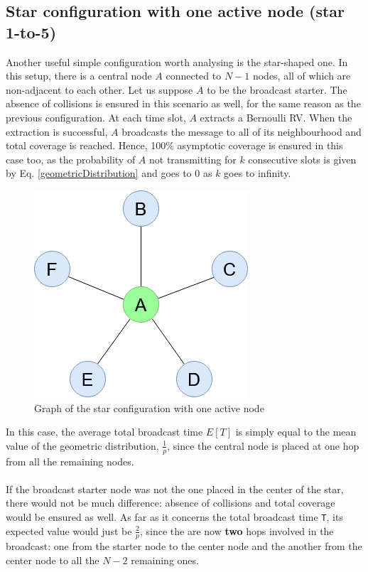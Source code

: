 \subsection{Star configuration with one active node (star 1-to-5)}
\label{ssec:star1}
Another useful simple configuration worth analysing is the star-shaped one. In
this setup, there is a central node $A$ connected to $N - 1$ nodes, all of which
are non-adjacent to each other. Let us suppose $A$ to be the broadcast starter.
The absence of collisions is ensured in this scenario as well, for the
same reason as the previous configuration.
At each time slot, $A$ extracts a Bernoulli RV. When the extraction is
successful, $A$ broadcasts the message to all of its neighbourhood and total
coverage is reached. Hence, 100\% asymptotic coverage is ensured in this case
too, as the probability of $A$ not transmitting for $k$ consecutive slots is
given by Eq. \ref{geometricDistribution} and goes to $0$ as $k$ goes to
infinity.
\begin{figure}[H]
    \begin{center}
        \includegraphics[scale=0.6]{img/star_graph.png}
        \caption{Graph of the star configuration with one active node}
        \label{fig:star1to5}
    \end{center}
\end{figure}
\noindent
In this case, the average total broadcast time $E[T]$ is simply equal to the
mean value of the geometric distribution, $\frac{1}{p}$, since the central
node is placed at one hop from all the remaining nodes.\\
\\
If the broadcast starter node was not the one placed in the center of the star,
there would not be much difference: absence of collisions and total coverage
would be ensured as well. As far as it concerns the total broadcast time
\texttt{T}, its expected value would just be $\frac{2}{p}$, since
the are now \textbf{two} hops involved in the broadcast: one from the starter
node to the center node and the another from the center node to all the $N - 2$
remaining ones.

